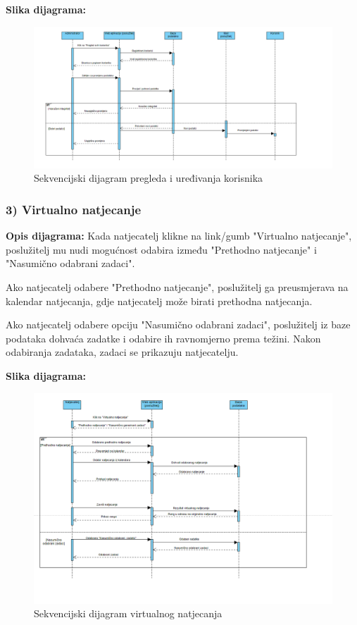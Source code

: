 					\textbf{Slika dijagrama:}
					\begin{figure}[H]
					\centering
						\includegraphics[scale=0.4]{slike/Pregled korisnika}
						\centering
					\caption{Sekvencijski dijagram pregleda i uređivanja korisnika}
					\end{figure}
					
					\subsubsection{3) Virtualno natjecanje}
					
					\textbf{Opis dijagrama:}
					Kada natjecatelj klikne na link/gumb "Virtualno natjecanje", poslužitelj mu nudi mogućnost odabira između "Prethodno natjecanje" i "Nasumično odabrani zadaci".
					
					Ako natjecatelj odabere "Prethodno natjecanje", poslužitelj ga preusmjerava na kalendar natjecanja, gdje natjecatelj može birati prethodna natjecanja.
					
					Ako natjecatelj odabere opciju "Nasumično odabrani zadaci", poslužitelj iz baze podataka dohvaća zadatke i odabire ih ravnomjerno prema težini. Nakon odabiranja zadataka, zadaci se prikazuju natjecatelju.
					
					\textbf{Slika dijagrama:}
					\begin{figure}[H]
					\centering
					\includegraphics[scale=0.4]{slike/Virtualno natjecanje}
					\caption{Sekvencijski dijagram virtualnog natjecanja}
					\end{figure}
			
